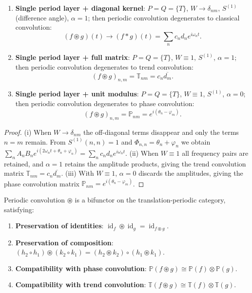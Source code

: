 \begin{proposition}\label{prop:periodic_convolution_degenerations}
\begin{enumerate}[label=(\roman*)]
    \item \textbf{Single period layer + diagonal kernel}: $P = Q = \{T\}$, $W \to \delta_{nm}$, $S^{(1)}$ (difference angle), $\alpha = 1$; then periodic convolution degenerates to classical convolution:
    \[
    (f \circledast g)(t) \to (f * g)(t) = \sum_n c_n d_n e^{i\omega_n t}.
    \]
    \item \textbf{Single period layer + full matrix}: $P = Q = \{T\}$, $W \equiv 1$, $S^{(1)}$, $\alpha = 1$; then periodic convolution degenerates to trend convolution:
    \[
    (f \circledast g)_{n,m} = \mathbb{T}_{nm} = c_n \overline{d_m}.
    \]
    \item \textbf{Single period layer + unit modulus}: $P = Q = \{T\}$, $W \equiv 1$, $S^{(1)}$, $\alpha = 0$; then periodic convolution degenerates to phase convolution:
    \[
    (f \circledast g)_{n,m} = \mathbb{P}_{nm} = e^{i(\theta_n - \varphi_m)}.
    \]
\end{enumerate}
\end{proposition}

\begin{proof}
(i) When $W \to \delta_{nm}$ the off-diagonal terms disappear and only the terms $n = m$ remain. From $S^{(1)}(n,n) = 1$ and $\Phi_{n,n} = \theta_n + \varphi_n$ we obtain $\sum_n A_n B_n e^{i(2\omega_n t + \theta_n + \varphi_n)} = \sum_n c_n d_n e^{i\omega_n t}$.
(ii) When $W \equiv 1$ all frequency pairs are retained, and $\alpha = 1$ retains the amplitude products, giving the trend convolution matrix $\mathbb{T}_{nm} = c_n \overline{d_m}$.
(iii) With $W \equiv 1$, $\alpha = 0$ discards the amplitudes, giving the phase convolution matrix $\mathbb{P}_{nm} = e^{i(\theta_n - \varphi_m)}$.
\end{proof}

\begin{theorem}\label{thm:periodic_convolution_functoriality_series}
Periodic convolution $\circledast$ is a bifunctor on the translation-periodic category, satisfying:
\begin{enumerate}[label=(\roman*)]
    \item \textbf{Preservation of identities}: $\operatorname{id}_f \circledast \operatorname{id}_g = \operatorname{id}_{f \circledast g}$.
    \item \textbf{Preservation of composition}: $(h_2 \circ h_1) \circledast (k_2 \circ k_1) = (h_2 \circledast k_2) \circ (h_1 \circledast k_1)$.
    \item \textbf{Compatibility with phase convolution}: $\mathbb{P}(f \circledast g) \cong \mathbb{P}(f) \otimes \mathbb{P}(g)$.
    \item \textbf{Compatibility with trend convolution}: $\mathbb{T}(f \circledast g) \cong \mathbb{T}(f) \otimes \mathbb{T}(g)$.
\end{enumerate}
\end{theorem}

